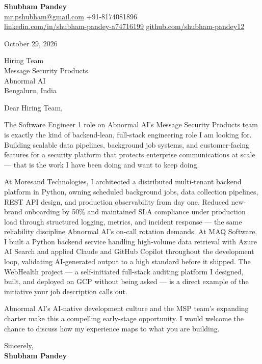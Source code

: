 \documentclass[a4paper,11pt]{article}
\begin{document}
\textbf{\Large Shubham Pandey}\\
\href{mailto:mr.pshubham@gmail.com}{mr.pshubham@gmail.com} \quad +91-8174081896\\
\href{https://www.linkedin.com/in/shubham-pandey-a74716199/}{linkedin.com/in/shubham-pandey-a74716199} \quad
\href{https://github.com/shubham-pandey12}{github.com/shubham-pandey12}

\vspace{1em}
October 29, 2026

\vspace{1em}
Hiring Team\\
Message Security Products\\
Abnormal AI\\
Bengaluru, India

\vspace{1em}
Dear Hiring Team,

The Software Engineer 1 role on Abnormal AI's Message Security Products team is exactly the kind of backend-lean, full-stack engineering role I am looking for. Building scalable data pipelines, background job systems, and customer-facing features for a security platform that protects enterprise communications at scale --- that is the work I have been doing and want to keep doing.

At Moresand Technologies, I architected a distributed multi-tenant backend platform in Python, owning scheduled background jobs, data collection pipelines, REST API design, and production observability from day one. Reduced new-brand onboarding by 50\% and maintained SLA compliance under production load through structured logging, metrics, and incident response --- the same reliability discipline Abnormal AI's on-call rotation demands. At MAQ Software, I built a Python backend service handling high-volume data retrieval with Azure AI Search and applied Claude and GitHub Copilot throughout the development loop, validating AI-generated output to a high standard before it shipped. The WebHealth project --- a self-initiated full-stack auditing platform I designed, built, and deployed on GCP without being asked --- is a direct example of the initiative your job description calls out.

Abnormal AI's AI-native development culture and the MSP team's expanding charter make this a compelling early-stage opportunity. I would welcome the chance to discuss how my experience maps to what you are building.

\vspace{1em}
Sincerely,\\[0.5em]
\textbf{Shubham Pandey}
\end{document}
